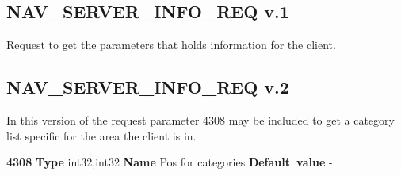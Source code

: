 %
% 
% 
% 
%

\subsection{NAV\_SERVER\_INFO\_REQ v.1}

Request to get the parameters that holds information for the client.

\subsection{NAV\_SERVER\_INFO\_REQ v.2}

In this version of the request parameter 4308 may be included to get
a category list specific for the area the client is in.

\begin{list}{\textbf{ParamID}}{}
\label{Category position}
\item \textbf{4308} \textbf{Type} int32,int32 \textbf{Name} Pos for categories \textbf{Default~value} - \\
\end{list}

